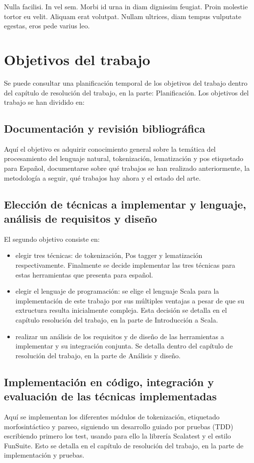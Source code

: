 \begin{savequote}[75mm]
Nulla facilisi. In vel sem. Morbi id urna in diam dignissim feugiat. Proin molestie tortor eu velit. Aliquam erat volutpat. Nullam ultrices, diam tempus vulputate egestas, eros pede varius leo.
\end{savequote}

\chapter{Objetivos del trabajo}
Se puede consultar una planificación temporal de los objetivos del trabajo dentro del capítulo de resolución del trabajo, en la parte: Planificación. Los objetivos del trabajo se han dividido en: 
\section{Documentación y revisión bibliográfica}
Aquí el objetivo es adquirir conocimiento general sobre la temática del procesamiento del lenguaje natural, tokenización, lematización y pos etiquetado para Español, documentarse sobre qué trabajos se han realizado anteriormente, la metodología a seguir, qué trabajos hay ahora y el estado del arte. 
\section{Elección de técnicas a implementar y lenguaje, análisis de requisitos y diseño}
El segundo objetivo consiste en:
\begin{itemize}
\item elegir tres técnicas: de tokenización, Pos tagger y lematización respectivamente. Finalmente se decide implementar las tres técnicas para estas herramientas que presenta \citet{smedt2012pattern} para español.
\item elegir el lenguaje de programación: se elige el lenguaje Scala para la implementación de este trabajo por sus múltiples ventajas a pesar de que su extructura resulta inicialmente compleja. Esta decisión se detalla en el capítulo resolución del trabajo, en la parte de Introducción a Scala.
\item realizar un análisis de los requisitos y de diseño de las herramientas a implementar y su integración conjunta. Se detalla dentro del capítulo de resolución del trabajo, en la parte de Análisis y diseño.
\end{itemize}

\section{Implementación en código, integración y evaluación de las técnicas implementadas}
Aquí se implementan los diferentes módulos de tokenización, etiquetado morfosintáctico y parseo, siguiendo un desarrollo guiado por pruebas (TDD) escribiendo primero los test, usando para ello la librería Scalatest y el estilo FunSuite. Esto se detalla en el capítulo de resolución del trabajo, en la parte de implementación y pruebas. 

